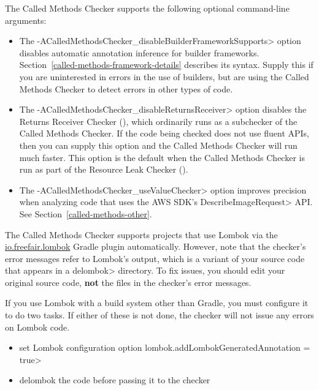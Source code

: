 The Called Methods Checker supports the following optional command-line arguments:
\begin{itemize}
\item The \<-ACalledMethodsChecker\_disableBuilderFrameworkSupports> option disables automatic
 annotation inference for builder frameworks.
 Section~\ref{called-methods-framework-details} describes its syntax.
 Supply this if you are uninterested in errors in the use of builders, but
 are using the Called Methods Checker to detect errors in other types of
 code.
\item The \<-ACalledMethodsChecker\_disableReturnsReceiver> option disables
  the Returns Receiver Checker (),
  which ordinarily runs as a subchecker of the Called Methods Checker.  If
  the code being checked does not use fluent APIs, then you can supply this
  option and the Called Methods Checker will run much faster. This option is the default
  when the Called Methods Checker is run as part of the Resource Leak Checker ().
\item The \<-ACalledMethodsChecker\_useValueChecker> option improves precision when analyzing
 code that uses the AWS SDK's \<DescribeImageRequest> API\@.  See
 Section~\ref{called-methods-other}.
\end{itemize}


The Called Methods Checker supports projects that use Lombok via
the \href{https://plugins.gradle.org/plugin/io.freefair.lombok}{io.freefair.lombok} Gradle plugin automatically.
However, note that the checker's error messages refer to Lombok's output, which is a variant of your source code
that appears in a \<delombok> directory.
To fix issues, you should edit your original source code, \textbf{not} the files in the checker's error messages.

If you use Lombok with a build system other than Gradle, you must configure it to do two tasks.
If either of these is not done, the checker will not issue any errors on Lombok code.
\begin{itemize}
\item set Lombok configuration option \<lombok.addLombokGeneratedAnnotation = true>
\item delombok the code before passing it to the checker
\end{itemize}



